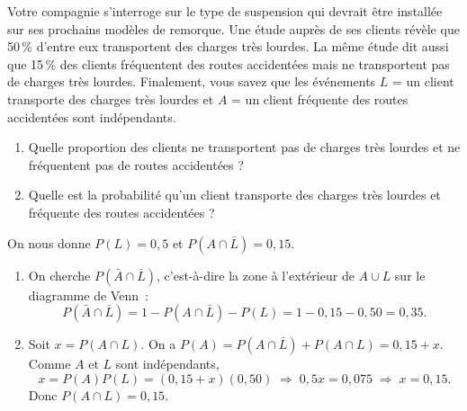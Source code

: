 

\begin{exercice}
Votre compagnie s'interroge sur le type de suspension qui devrait être installée sur ses
prochains modèles de remorque. Une étude auprès de ses clients révèle que 50\,\% d'entre eux
transportent des charges très lourdes. La même étude dit aussi que 15\,\% des clients
fréquentent des routes accidentées mais ne transportent pas de charges très lourdes.
Finalement, vous savez que les événements $L$ = \og un client transporte des charges très
lourdes \fg{} et $A$ = \og un client fréquente des routes accidentées \fg{} sont indépendants.
\begin{enumerate}[label=(\alph*)]
  \item Quelle proportion des clients ne transportent pas de charges très lourdes et ne
  fréquentent pas de routes accidentées ?
  \item Quelle est la probabilité qu'un client transporte des charges très lourdes et
  fréquente des routes accidentées ?
\end{enumerate}
\begin{solution}
On nous donne $P(L)=0,5$ et $P(A\cap \bar L)=0,15$.
\begin{enumerate}[label=(\alph*)]
  \item On cherche $P(\bar A\cap \bar L)$, c'est-à-dire la zone à l'extérieur de $A\cup L$
  sur le diagramme de Venn~:
  \[
    P(\bar A\cap \bar L)=1-P(A\cap\bar L)-P(L)=1-0,15-0,50=0,35.
  \]
  \item Soit $x=P(A\cap L)$. On a $P(A)=P(A\cap\bar L)+P(A\cap L)=0,15+x$. Comme $A$ et $L$
  sont indépendants,
  \[
    x=P(A)P(L)=(0,15+x)(0,50)\;\Longrightarrow\;0,5x=0,075\;\Longrightarrow\;x=0,15.
  \]
  Donc $P(A\cap L)=0,15$.
\end{enumerate}
\end{solution}
\end{exercice}

